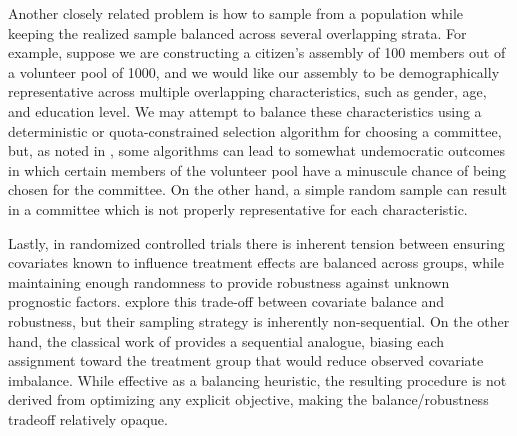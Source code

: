 Another closely related problem is how to sample from a population while keeping the realized sample balanced across several overlapping strata. For example, suppose we are constructing a citizen's assembly of 100 members out of a volunteer pool of 1000, and we would like our assembly to be demographically representative across multiple overlapping characteristics, such as gender, age, and education level. We may attempt to balance these characteristics using a deterministic or quota-constrained selection algorithm for choosing a committee, but, as noted in \cite{flanigan2021_fair_algorithms_citizens_assemblies}, some algorithms can lead to somewhat undemocratic outcomes in which certain members of the volunteer pool have a minuscule chance of being chosen for the committee. On the other hand, a simple random sample can result in a committee which is not properly representative for each characteristic.

Lastly, in randomized controlled trials there is inherent tension between ensuring covariates known to influence treatment effects are balanced across groups, while maintaining enough randomness to provide robustness against unknown prognostic factors. \cite{harshaw2024_gram_schmidt_walk_design} explore this trade-off between covariate balance and robustness, but their sampling strategy is inherently non-sequential. On the other hand, the classical work of \cite{pocock1975_sequential_treatment_assignment} provides a sequential analogue, biasing each assignment toward the treatment group that would reduce observed covariate imbalance. While effective as a balancing heuristic, the resulting procedure is not derived from optimizing any explicit objective, making the balance/robustness tradeoff relatively opaque.


